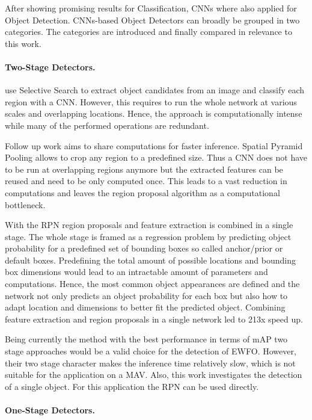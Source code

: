 After showing promising results for Classification, \acp{CNN} where also applied for Object Detection. \acp{CNN}-based Object Detectors can broadly be grouped in two categories. The categories are introduced and finally compared in relevance to this work.

\paragraph{Two-Stage Detectors.}

\citeauthor{Girshick2013} \cite{Girshick2013} use Selective Search \cite{Uijlings2013} to extract object candidates from an image and classify each region with a \ac{CNN}. However, this requires to run the whole network at various scales and overlapping locations. Hence, the approach is computationally intense while many of the performed operations are redundant.

Follow up work aims to share computations for faster inference. Spatial Pyramid Pooling \cite{He2014b} allows to crop any region to a predefined size. Thus a \ac{CNN} does not have to be run at overlapping regions anymore but the extracted features can be reused and need to be only computed once. This leads to a vast reduction in computations and leaves the region proposal algorithm as a computational bottleneck.

With the \ac{RPN}\cite{Ren2015} region proposals and feature extraction is combined in a single stage. The whole stage is framed as a regression problem by predicting object probability for a predefined set of bounding boxes so called anchor/prior or default boxes.  Predefining the total amount of possible locations and bounding box dimensions would lead to an intractable amount of parameters and computations. Hence, the most common object appearances are defined and the network not only predicts an object probability for each box but also how to adapt location and dimensions to better fit the predicted object.
Combining feature extraction and region proposals in a single network led to 213x speed up.
 
Being currently the method with the best performance in terms of \ac{mAP} two stage approaches would be a valid choice for the detection of \ac{EWFO}. However, their two stage character makes the inference time relatively slow, which is not suitable for the application on a \ac{MAV}. Also, this work investigates the detection of a single object. For this application the \ac{RPN} can be used directly.

\paragraph{One-Stage Detectors.}

